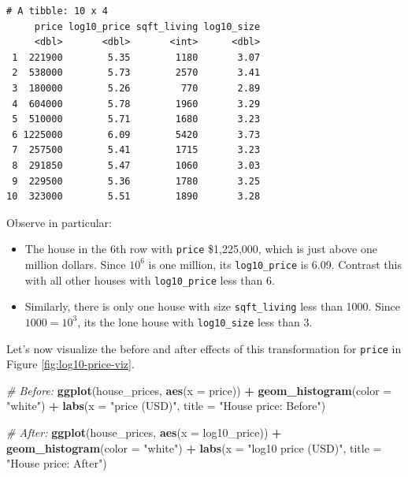 \documentclass[12pt,]{krantz}
\makeatletter
\newenvironment{Shaded}{\begin{snugshade}}{\end{snugshade}}
\newcommand{\KeywordTok}[1]{\textcolor[rgb]{0.27,0.27,0.27}{\textbf{#1}}}
\newcommand{\DataTypeTok}[1]{\textcolor[rgb]{0.27,0.27,0.27}{#1}}
\newcommand{\StringTok}[1]{\textcolor[rgb]{0.5,0.5,0.5}{#1}}
\newcommand{\CommentTok}[1]{\textcolor[rgb]{0.37,0.37,0.37}{\textit{#1}}}
\newcommand{\OperatorTok}[1]{\textcolor[rgb]{0.43,0.43,0.43}{\textbf{#1}}}
\newcommand{\NormalTok}[1]{#1}
\providecommand{\tightlist}{%
  \setlength{\itemsep}{0pt}\setlength{\parskip}{0pt}}
\newenvironment{kframe}{%
\medskip{}
\setlength{\fboxsep}{.8em}
 \def\at@end@of@kframe{}%
 \ifinner\ifhmode%
  \def\at@end@of@kframe{\end{minipage}}%
  \begin{minipage}{\columnwidth}%
 \fi\fi%
 \def\FrameCommand##1{\hskip\@totalleftmargin \hskip-\fboxsep
 \colorbox{shadecolor}{##1}\hskip-\fboxsep
     \hskip-\linewidth \hskip-\@totalleftmargin \hskip\columnwidth}%
 \MakeFramed {\advance\hsize-\width
   \@totalleftmargin\z@ \linewidth\hsize
   \@setminipage}}%
 {\par\unskip\endMakeFramed%
 \at@end@of@kframe}
\renewenvironment{Shaded}{\begin{kframe}}{\end{kframe}}
\makeatother
\begin{document}
\begin{verbatim}
# A tibble: 10 x 4
     price log10_price sqft_living log10_size
     <dbl>       <dbl>       <int>      <dbl>
 1  221900        5.35        1180       3.07
 2  538000        5.73        2570       3.41
 3  180000        5.26         770       2.89
 4  604000        5.78        1960       3.29
 5  510000        5.71        1680       3.23
 6 1225000        6.09        5420       3.73
 7  257500        5.41        1715       3.23
 8  291850        5.47        1060       3.03
 9  229500        5.36        1780       3.25
10  323000        5.51        1890       3.28
\end{verbatim}

Observe in particular:

\begin{itemize}
\tightlist
\item
  The house in the 6th row with \texttt{price} \$1,225,000, which is
  just above one million dollars. Since \(10^6\) is one million, its
  \texttt{log10\_price} is 6.09. Contrast this with all other houses
  with \texttt{log10\_price} less than 6.
\item
  Similarly, there is only one house with size \texttt{sqft\_living}
  less than 1000. Since \(1000 = 10^3\), its the lone house with
  \texttt{log10\_size} less than 3.
\end{itemize}

Let's now visualize the before and after effects of this transformation
for \texttt{price} in Figure \ref{fig:log10-price-viz}.

\begin{Shaded}
\begin{Highlighting}[]
\CommentTok{# Before:}
\KeywordTok{ggplot}\NormalTok{(house_prices, }\KeywordTok{aes}\NormalTok{(}\DataTypeTok{x =}\NormalTok{ price)) }\OperatorTok{+}
\StringTok{  }\KeywordTok{geom_histogram}\NormalTok{(}\DataTypeTok{color =} \StringTok{"white"}\NormalTok{) }\OperatorTok{+}
\StringTok{  }\KeywordTok{labs}\NormalTok{(}\DataTypeTok{x =} \StringTok{"price (USD)"}\NormalTok{, }\DataTypeTok{title =} \StringTok{"House price: Before"}\NormalTok{)}

\CommentTok{# After:}
\KeywordTok{ggplot}\NormalTok{(house_prices, }\KeywordTok{aes}\NormalTok{(}\DataTypeTok{x =}\NormalTok{ log10_price)) }\OperatorTok{+}
\StringTok{  }\KeywordTok{geom_histogram}\NormalTok{(}\DataTypeTok{color =} \StringTok{"white"}\NormalTok{) }\OperatorTok{+}
\StringTok{  }\KeywordTok{labs}\NormalTok{(}\DataTypeTok{x =} \StringTok{"log10 price (USD)"}\NormalTok{, }\DataTypeTok{title =} \StringTok{"House price: After"}\NormalTok{)}
\end{Highlighting}
\end{Shaded}
\end{document}
